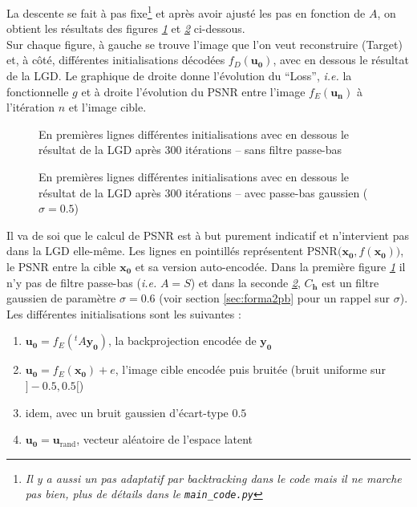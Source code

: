 \documentclass[hidelinks, french]{article} %
\newcommand{\ie}{\textit{i.e. }}
\renewcommand{\bf}[1]{\boldsymbol{#1}}
\theoremstyle{enonce}
\theoremstyle{special}
\theoremstyle{rq}
\theoremstyle{exo}
\theoremstyle{demo}
\begin{document}
La descente se fait à pas fixe\footnote{\emph{Il y a aussi un pas adaptatif par backtracking dans le code mais il ne marche pas bien, plus de détails dans le \texttt{main\_code.py}}} et après avoir ajusté les pas en fonction de $A$, on obtient les résultats des figures \textit{\ref{fig:LGDinits}} et \textit{\ref{fig:LGDinitg}} ci-dessous.
\\
Sur chaque figure, à gauche se trouve l'image que l'on veut reconstruire (Target) et, à côté, différentes initialisations décodées $f_D(\bf{u_0})$, avec en dessous le résultat de la LGD.
Le graphique de droite donne l'évolution du ``Loss'', \ie la fonctionnelle $g$ et à droite l'évolution du PSNR entre l'image $f_E(\bf{u_n})$ à l'itération $n$ et l'image cible.
\begin{figure}[H]\centering
	
	\caption{En premières lignes différentes initialisations avec en dessous le résultat de la LGD après 300 itérations -- sans filtre passe-bas}
	\label{fig:LGDinits}
\end{figure}

\begin{figure}[H]\centering
	
	\caption{En premières lignes différentes initialisations avec en dessous le résultat de la LGD après 300 itérations --  avec passe-bas gaussien ($\sigma=0.5$)}
	\label{fig:LGDinitg}
\end{figure}

Il va de soi que le calcul de PSNR est à but purement indicatif et n'intervient pas dans la LGD elle-même. Les lignes en pointillés représentent PSNR$\big(\bf{x_0},f(\bf{x_0})\big)$, le PSNR entre la cible $\bf{x_0}$ et sa version auto-encodée.
Dans la première figure \textit{\ref{fig:LGDinits}} il n'y pas de filtre passe-bas (\ie $A=S$) et dans la seconde \textit{\ref{fig:LGDinitg}}, $C_{\bf{h}}$ est un filtre gaussien de paramètre $\sigma=0.6$ (voir section \ref{sec:forma2pb} pour un rappel sur $\sigma$).
\\
Les différentes initialisations sont les suivantes :
\begin{enumerate}[label=(\arabic*)]
	\item $\bf{u_0}=f_E(^tA\bf{y_0})$, la backprojection encodée de $\bf{y_0}$
	\item $\bf{u_0}=f_E(\bf{x_0})+e$, l'image cible encodée puis bruitée (bruit uniforme sur $]-0.5,0.5[$)
	\item idem, avec un bruit gaussien d'écart-type $0.5$
	\item $\bf{u_0}=\bf{u}_{\text{rand}}$,  vecteur aléatoire de l'espace latent
\end{enumerate}
\end{document}

